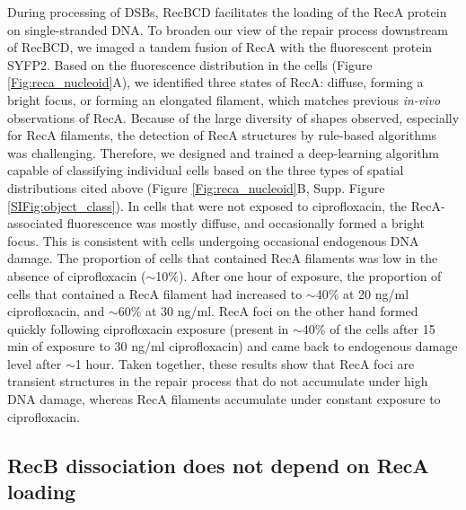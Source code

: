 During processing of DSBs, RecBCD facilitates the loading of the RecA protein on single-stranded DNA. To broaden our view of the repair process downstream of RecBCD, we imaged a tandem fusion of RecA with the fluorescent protein SYFP2\cite{Wiktor2021}. Based on the fluorescence distribution in the cells (Figure \ref{Fig:reca_nucleoid}A), we identified three states of RecA: diffuse, forming a bright focus, or forming an elongated filament, which matches previous \emph{in-vivo} observations of RecA\cite{Wiktor2021}. Because of the large diversity of shapes observed, especially for RecA filaments, the detection of RecA structures by rule-based algorithms was challenging. Therefore, we designed and trained a deep-learning algorithm capable of classifying individual cells based on the three types of spatial distributions cited above (Figure \ref{Fig:reca_nucleoid}B, Supp. Figure \ref{SIFig:object_class}). In cells that were not exposed to ciprofloxacin, the RecA-associated fluorescence was mostly diffuse, and occasionally formed a bright focus. This is consistent with cells undergoing occasional endogenous DNA damage. The proportion of cells that contained RecA filaments was low in the absence of ciprofloxacin ($\sim$10\%). After one hour of exposure, the proportion of cells that contained a RecA filament had increased to $\sim$40\% at 20 ng/ml ciprofloxacin, and $\sim$60\% at 30 ng/ml. RecA foci on the other hand formed quickly following ciprofloxacin exposure (present in $\sim$40\% of the cells after 15 min of exposure to 30 ng/ml ciprofloxacin) and came back to endogenous damage level after $\sim$1 hour. Taken together, these results show that RecA foci are transient structures in the repair process that do not accumulate under high DNA damage, whereas RecA filaments accumulate under constant exposure to ciprofloxacin.

\subsection*{RecB dissociation does not depend on RecA loading}

